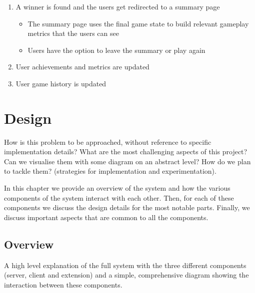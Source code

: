 \documentclass{l4proj}
\begin{document}
\begin{enumerate}
\begin{itemize}
    \end{itemize}
    \item A winner is found and the users get redirected to a summary page
    \begin{itemize}
 	\item The summary page uses the final game state to build relevant gameplay metrics that the users can see  
           \item Users have the option to leave the summary or play again
    \end{itemize}
    \item User achievements and metrics are updated
    \item User game history is updated 
\end{enumerate}


\chapter{Design}
How is this problem to be approached, without reference to specific implementation details? 
What are the most challenging aspects of this project? Can we visualise them with some diagram on an abstract level? How do we plan to tackle them? (strategies for implementation and experimentation).

In this chapter we provide an overview of the system and how the various components of the system interact with each other. Then, for each of these components we discuss the design details for the most notable parts. Finally, we discuss important aspects that are common to all the components. 

\section{Overview}
A high level explanation of the full system with the three different components (server, client and extension) and a simple, comprehensive diagram showing the interaction between these components.
\end{document}
